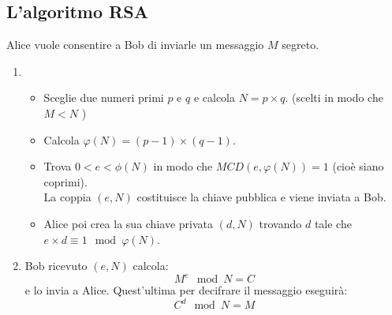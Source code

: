 \documentclass[14pt,a4paper]{article}
\begin{document}
	\subsection{L'algoritmo RSA}
	Alice vuole consentire a Bob di inviarle un messaggio $ M $ segreto.
	\begin{enumerate}
		\item 
		\begin{itemize}
			\item Sceglie due numeri primi $ p $ e $ q $ e calcola $ N=p\times q $. (scelti in modo che $ M<N $ )
			\item Calcola $ \varphi(N)=(p-1)\times (q-1) $. 
			\item Trova $ 0<e<\phi(N) $ in modo che $ MCD(e,\varphi(N))=1 $ (cioè siano coprimi).\\ La coppia $ \boxed{(e,N)} $ costituisce la chiave pubblica e viene inviata a Bob.
			\item Alice poi crea la sua chiave privata $ \boxed{(d,N)} $ trovando $d $ tale che \\$ \boxed{e\times d\equiv 1 \mod \varphi(N) } $.
		\end{itemize}
		\item Bob ricevuto $ (e,N) $ calcola: \[ M^e \mod N=C \] e lo invia a Alice. Quest'ultima per decifrare il messaggio eseguirà:\[ C^d \mod N =M \]
	\end{enumerate}
\end{document}
